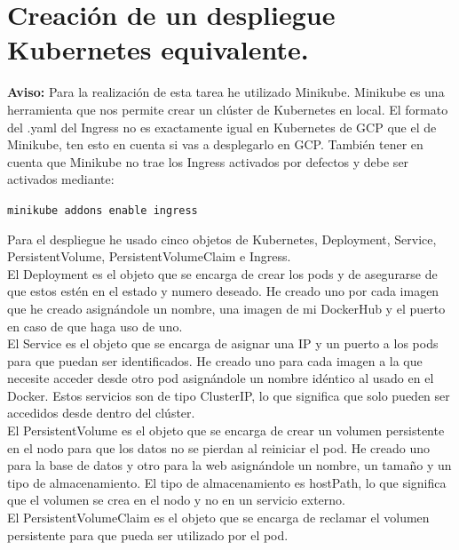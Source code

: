 \documentclass{report}
\begin{document}
        \section{Creación de un despliegue Kubernetes equivalente.}
            \textbf{Aviso:} Para la realización de esta tarea he utilizado Minikube. Minikube es una herramienta que nos permite crear un clúster de Kubernetes en local. El formato del .yaml del Ingress no es exactamente igual en Kubernetes de GCP que el de Minikube, ten esto en cuenta si vas a desplegarlo en GCP. También tener en cuenta que Minikube no trae los Ingress activados por defectos y debe ser activados mediante:
            \begin{center}
                \texttt{minikube addons enable ingress}
            \end{center}
            Para el despliegue he usado cinco objetos de Kubernetes, Deployment, Service, PersistentVolume, PersistentVolumeClaim e Ingress.\\

            El Deployment es el objeto que se encarga de crear los pods y de asegurarse de que estos estén en el estado y numero deseado.
            He creado uno por cada imagen que he creado asignándole un nombre, una imagen de mi DockerHub y el puerto en caso de que haga uso de uno.\\

            El Service es el objeto que se encarga de asignar una IP y un puerto a los pods para que puedan ser identificados.
            He creado uno para cada imagen a la que necesite acceder desde otro pod asignándole un nombre idéntico al usado en el Docker.
            Estos servicios son de tipo ClusterIP, lo que significa que solo pueden ser accedidos desde dentro del clúster.\\

            El PersistentVolume es el objeto que se encarga de crear un volumen persistente en el nodo para que los datos no se pierdan al reiniciar el pod.
            He creado uno para la base de datos y otro para la web asignándole un nombre, un tamaño y un tipo de almacenamiento.
            El tipo de almacenamiento es hostPath, lo que significa que el volumen se crea en el nodo y no en un servicio externo.\\

            El PersistentVolumeClaim es el objeto que se encarga de reclamar el volumen persistente para que pueda ser utilizado por el pod.\\
\end{document}
